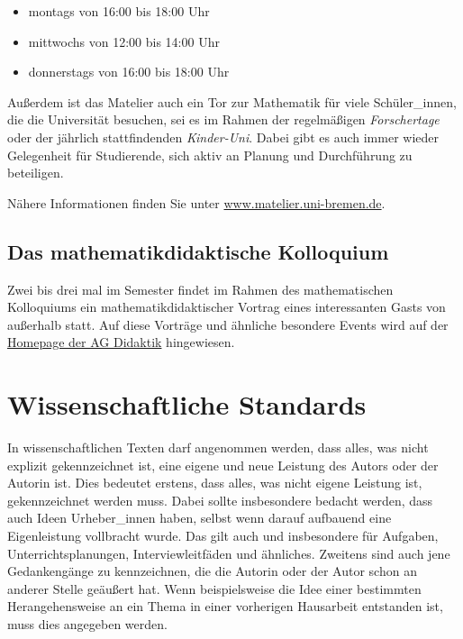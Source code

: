\documentclass[ngerman,oneside,12pt,a4paper]{scrbook}
\begin{document}
\begin{itemize}
\item
  montags von 16:00 bis 18:00 Uhr
\item
  mittwochs von 12:00 bis 14:00 Uhr
\item
  donnerstags von 16:00 bis 18:00 Uhr
\end{itemize}

Außerdem ist das Matelier auch ein Tor zur Mathematik für viele
Schüler\_innen, die die Universität besuchen, sei es im Rahmen der
regelmäßigen \emph{Forschertage} oder der jährlich stattfindenden
\emph{Kinder-Uni}. Dabei gibt es auch immer wieder Gelegenheit für
Studierende, sich aktiv an Planung und Durchführung zu beteiligen.

Nähere Informationen finden Sie unter \url{www.matelier.uni-bremen.de}.

\section{Das mathematikdidaktische
Kolloquium}\label{das-mathematikdidaktische-kolloquium}

Zwei bis drei mal im Semester findet im Rahmen des mathematischen
Kolloquiums ein mathematikdidaktischer Vortrag eines interessanten Gasts
von außerhalb statt. Auf diese Vorträge und ähnliche besondere Events
wird auf der \href{www.math.uni-bremen.de/didaktik/}{Homepage der AG
Didaktik} hingewiesen.

\chapter{Wissenschaftliche Standards}\label{wissenschaftliche-standards}

In wissenschaftlichen Texten darf angenommen werden, dass alles, was
nicht explizit gekennzeichnet ist, eine eigene und neue Leistung des
Autors oder der Autorin ist. Dies bedeutet erstens, dass alles, was
nicht eigene Leistung ist, gekennzeichnet werden muss. Dabei sollte
insbesondere bedacht werden, dass auch Ideen Urheber\_innen haben,
selbst wenn darauf aufbauend eine Eigenleistung vollbracht wurde. Das
gilt auch und insbesondere für Aufgaben, Unterrichtsplanungen,
Interviewleitfäden und ähnliches. Zweitens sind auch jene Gedankengänge
zu kennzeichnen, die die Autorin oder der Autor schon an anderer Stelle
geäußert hat. Wenn beispielsweise die Idee einer bestimmten
Herangehensweise an ein Thema in einer vorherigen Hausarbeit entstanden
ist, muss dies angegeben werden.
\end{document}
